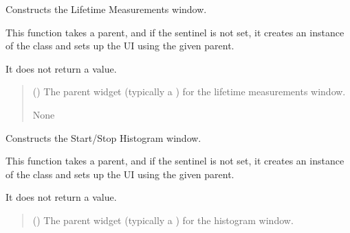 \documentclass[letterpaper,10pt,english]{sphinxmanual}
\begin{document}
\begin{fulllineitems}

\begin{fulllineitems}
\label{\detokenize{main:main.MainWindow.construct_lifetime}}
\pysigstartsignatures
{}
\pysigstopsignatures
\sphinxAtStartPar
Constructs the Lifetime Measurements window.

\sphinxAtStartPar
This function takes a  parent, and if the sentinel is not set, it creates 
an instance of the  class and sets up the UI using the given parent.

\sphinxAtStartPar
It does not return a value.
\begin{quote}\begin{description}
\sphinxAtStartPar
{} () \textendash{} The parent widget (typically a ) for the lifetime measurements window.

\sphinxAtStartPar
None

\end{description}\end{quote}

\end{fulllineitems}


\begin{fulllineitems}
\label{\detokenize{main:main.MainWindow.construct_start_stop_histogram}}
\pysigstartsignatures
{}
\pysigstopsignatures
\sphinxAtStartPar
Constructs the Start/Stop Histogram window.

\sphinxAtStartPar
This function takes a  parent, and if the sentinel is not set, it creates
an instance of the  class and sets up the UI using the given parent.

\sphinxAtStartPar
It does not return a value.
\begin{quote}\begin{description}
\sphinxAtStartPar
{} () \textendash{} The parent widget (typically a ) for the histogram window.


\end{description}
\end{quote}
\end{fulllineitems}
\end{fulllineitems}
\end{document}
